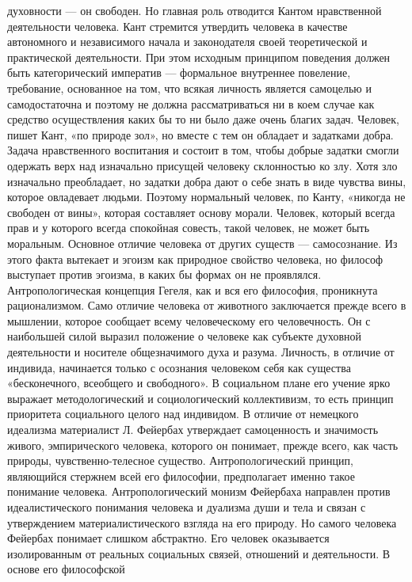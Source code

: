 \documentclass[12pt]{article}
\begin{document}
духовности — он свободен. Но главная роль отводится Кантом нравственной деятельности человека.
Кант  стремится  утвердить  человека  в  качестве  автономного  и  независимого  начала  и  законодателя  своей
теоретической  и  практической  деятельности.  При  этом  исходным  принципом  поведения  должен  быть
категорический императив — формальное внутреннее повеление, требование, основанное на том, что всякая
личность является самоцелью и самодостаточна и поэтому не должна рассматриваться ни в коем случае как
средство осуществления каких бы то ни было даже очень благих задач.
Человек, пишет Кант, «по природе зол», но вместе с тем он обладает и задатками добра. Задача нравственного
воспитания и состоит в том, чтобы добрые задатки смогли одержать верх над изначально присущей человеку
склонностью ко злу. Хотя зло изначально преобладает, но задатки добра дают о себе знать в виде чувства вины,
которое овладевает людьми. Поэтому нормальный человек, по Канту, «никогда не свободен от вины», которая
составляет основу морали. Человек, который всегда прав и у которого всегда спокойная совесть, такой человек,
не может быть моральным. Основное отличие человека от других существ — самосознание. Из этого факта
вытекает и эгоизм как природное свойство человека, но философ выступает против эгоизма, в каких бы формах
он не проявлялся.
Антропологическая концепция Гегеля, как и вся его философия, проникнута рационализмом. Само отличие
человека от животного заключается прежде всего в мышлении, которое сообщает всему человеческому его
человечность. Он с наибольшей силой выразил положение о человеке как субъекте духовной деятельности и
носителе общезначимого духа и разума. Личность, в отличие от индивида, начинается только с осознания
человеком себя как существа «бесконечного, всеобщего и свободного». В социальном плане его учение ярко
выражает методологический и социологический коллективизм, то есть принцип приоритета социального целого
над  индивидом.  В  отличие  от  немецкого  идеализма  материалист  Л.  Фейербах  утверждает  самоценность  и
значимость  живого,  эмпирического  человека,  которого  он  понимает,  прежде  всего,  как  часть  природы,
чувственно-телесное  существо.  Антропологический  принцип,  являющийся  стержнем  всей  его  философии,
предполагает  именно  такое понимание человека.  Антропологический монизм  Фейербаха направлен  против
идеалистического понимания человека и дуализма души и тела и связан с утверждением материалистического
взгляда на его природу. Но самого человека Фейербах понимает слишком абстрактно. Его человек оказывается
изолированным  от  реальных  социальных  связей,  отношений  и  деятельности.  В  основе  его  философской
\end{document}
